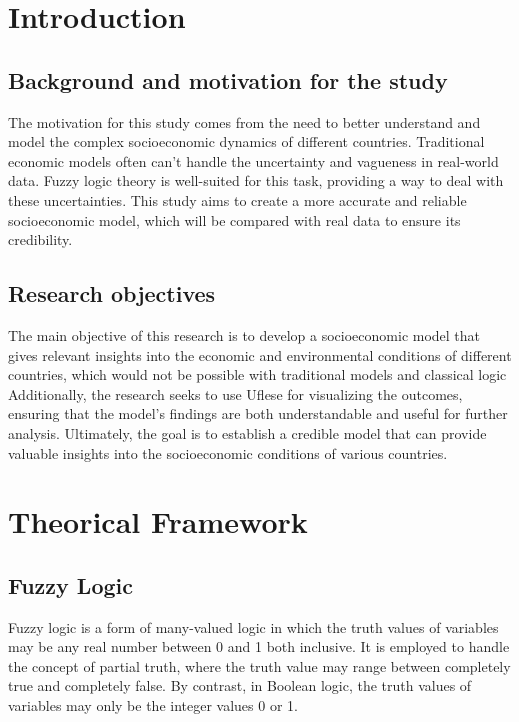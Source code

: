 \documentclass[fleqn,11pt]{article}
\begin{document}


\newpage
\tableofcontents

\newpage

\section{Introduction}

\subsection{Background and motivation for the study}
The motivation for this study comes from the need to better understand and model the complex socioeconomic dynamics of different countries.
Traditional economic models often can't handle the uncertainty and vagueness in real-world data.
Fuzzy logic theory is well-suited for this task, providing a way to deal with these uncertainties.
This study aims to create a more accurate and reliable socioeconomic model, which will be compared with real data to ensure its credibility.

\subsection{Research objectives}
The main objective of this research is to develop a socioeconomic model that gives relevant insights into the economic and environmental conditions of different countries, which would not be possible with traditional models and classical logic
Additionally, the research seeks to use Uflese for visualizing the outcomes, ensuring that the model's findings are both understandable and useful for further analysis. 
Ultimately, the goal is to establish a credible model that can provide valuable insights into the socioeconomic conditions of various countries.

\section{Theorical Framework}

\subsection{Fuzzy Logic}
Fuzzy logic is a form of many-valued logic in which the truth values of variables may be any real number between 0 and 1 both inclusive. It is employed to handle the concept of partial truth, where the truth value may range between completely true and completely false. By contrast, in Boolean logic, the truth values of variables may only be the integer values 0 or 1.
\end{document}
